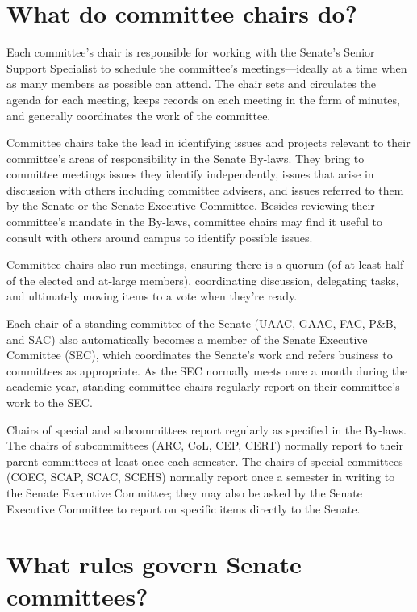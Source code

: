 \documentclass[12pt]{article}
\begin{document}
\section{What do committee chairs
do?}\label{what-do-committee-chairs-do}

Each committee's chair is responsible for working with the Senate's
Senior Support Specialist to schedule the committee's meetings---ideally
at a time when as many members as possible can attend. The chair sets
and circulates the agenda for each meeting, keeps records on each
meeting in the form of minutes, and generally coordinates the work of
the committee.

Committee chairs take the lead in identifying issues and projects
relevant to their committee's areas of responsibility in the Senate
By-laws. They bring to committee meetings issues they identify
independently, issues that arise in discussion with others including
committee advisers, and issues referred to them by the Senate or the
Senate Executive Committee. Besides reviewing their committee's mandate
in the By-laws, committee chairs may find it useful to consult with
others around campus to identify possible issues.

Committee chairs also run meetings, ensuring there is a quorum (of at
least half of the elected and at-large members), coordinating
discussion, delegating tasks, and ultimately moving items to a vote when
they're ready.

Each chair of a standing committee of the Senate (UAAC, GAAC, FAC, P\&B,
and SAC) also automatically becomes a member of the Senate Executive
Committee (SEC), which coordinates the Senate's work and refers business
to committees as appropriate. As the SEC normally meets once a month
during the academic year, standing committee chairs regularly report on
their committee's work to the SEC.

Chairs of special and subcommittees report regularly as specified in the
By-laws. The chairs of subcommittees (ARC, CoL, CEP, CERT) normally
report to their parent committees at least once each semester. The
chairs of special committees (COEC, SCAP, SCAC, SCEHS) normally report
once a semester in writing to the Senate Executive Committee; they may
also be asked by the Senate Executive Committee to report on specific
items directly to the Senate.

\section{What rules govern Senate
committees?}\label{what-rules-govern-senate-committees}
\end{document}
